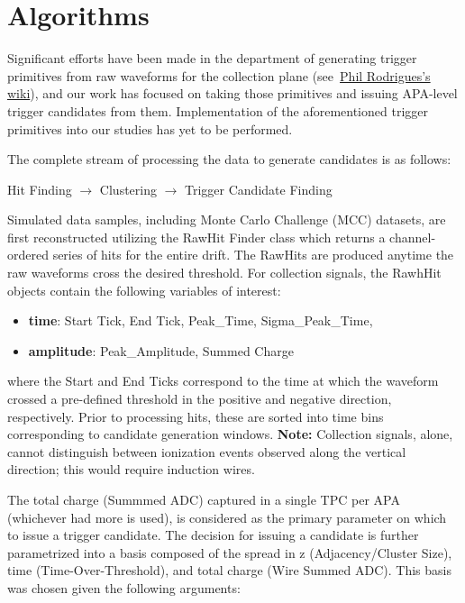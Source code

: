 \documentclass[10pt]{article}
\begin{document}
\section{Algorithms}

Significant efforts have been made in the department of generating trigger primitives from raw waveforms for the collection plane (see~\href{https://wiki.dunescience.org/wiki/Tools_for_2018_Trigger_Primitive_Studies}{Phil Rodrigues's wiki}), and our work has focused on taking those primitives and issuing APA-level trigger candidates from them.
Implementation of the aforementioned trigger primitives into our studies has yet to be performed.

The complete stream of processing the data to generate candidates is as follows:

\begin{center}
Hit Finding $\rightarrow$ Clustering $\rightarrow$ Trigger Candidate Finding    
\end{center}

Simulated data samples, including Monte Carlo Challenge (MCC) datasets, are first reconstructed utilizing the RawHit Finder class which returns a channel-ordered series of hits for the entire drift. The RawHits are produced anytime the raw waveforms cross the desired threshold. For collection signals, the RawhHit objects contain the following variables of interest: 
\begin{itemize}
\setlength\itemsep{0em}
    \item \textbf{time}: Start Tick, End Tick, Peak\_Time, Sigma\_Peak\_Time, 
    \item \textbf{amplitude}: Peak\_Amplitude, Summed Charge 
\end{itemize}

where the Start and End Ticks correspond to the time at which the waveform crossed a pre-defined threshold in the positive and negative direction, respectively. Prior to processing hits, these are sorted into time bins corresponding to candidate generation windows. 
\textbf{Note:} Collection signals, alone, cannot distinguish between ionization events observed along the vertical direction; this would require induction wires. 


The total charge (Summmed ADC) captured in a single TPC per APA (whichever had more is used), is considered as the primary parameter on which to issue a trigger candidate. The decision for issuing a candidate is further parametrized into a basis composed of the spread in z (Adjacency/Cluster Size), time (Time-Over-Threshold), and total charge (Wire Summed ADC). This basis was chosen %
given the following arguments: 
\end{document}
